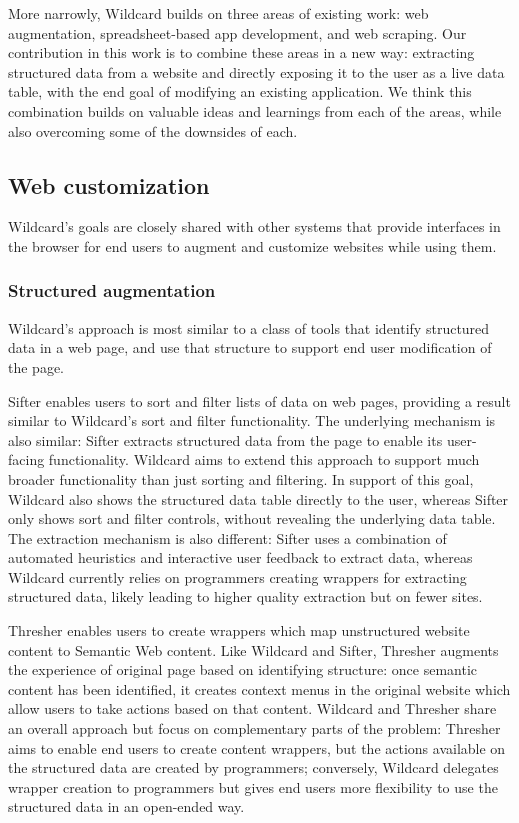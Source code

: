 \documentclass[english,submission]{programming}
\begin{document}
More narrowly, Wildcard builds on three areas of existing work: web
augmentation, spreadsheet-based app development, and web scraping. Our
contribution in this work is to combine these areas in a new way:
extracting structured data from a website and directly exposing it to
the user as a live data table, with the end goal of modifying an
existing application. We think this combination builds on valuable ideas
and learnings from each of the areas, while also overcoming some of the
downsides of each.

\hypertarget{web-customization}{%
\subsection{Web customization}\label{web-customization}}

Wildcard's goals are closely shared with other systems that provide
interfaces in the browser for end users to augment and customize
websites while using them.

\hypertarget{structured-augmentation}{%
\subsubsection{Structured augmentation}\label{structured-augmentation}}

Wildcard's approach is most similar to a class of tools that identify
structured data in a web page, and use that structure to support end
user modification of the page.

Sifter \autocite{huynh2006} enables users to sort and filter lists of
data on web pages, providing a result similar to Wildcard's sort and
filter functionality. The underlying mechanism is also similar: Sifter
extracts structured data from the page to enable its user-facing
functionality. Wildcard aims to extend this approach to support much
broader functionality than just sorting and filtering. In support of
this goal, Wildcard also shows the structured data table directly to the
user, whereas Sifter only shows sort and filter controls, without
revealing the underlying data table. The extraction mechanism is also
different: Sifter uses a combination of automated heuristics and
interactive user feedback to extract data, whereas Wildcard currently
relies on programmers creating wrappers for extracting structured data,
likely leading to higher quality extraction but on fewer sites.

Thresher \autocite{hogue2005} enables users to create wrappers which map
unstructured website content to Semantic Web content. Like Wildcard and
Sifter, Thresher augments the experience of original page based on
identifying structure: once semantic content has been identified, it
creates context menus in the original website which allow users to take
actions based on that content. Wildcard and Thresher share an overall
approach but focus on complementary parts of the problem: Thresher aims
to enable end users to create content wrappers, but the actions
available on the structured data are created by programmers; conversely,
Wildcard delegates wrapper creation to programmers but gives end users
more flexibility to use the structured data in an open-ended way.
\end{document}

